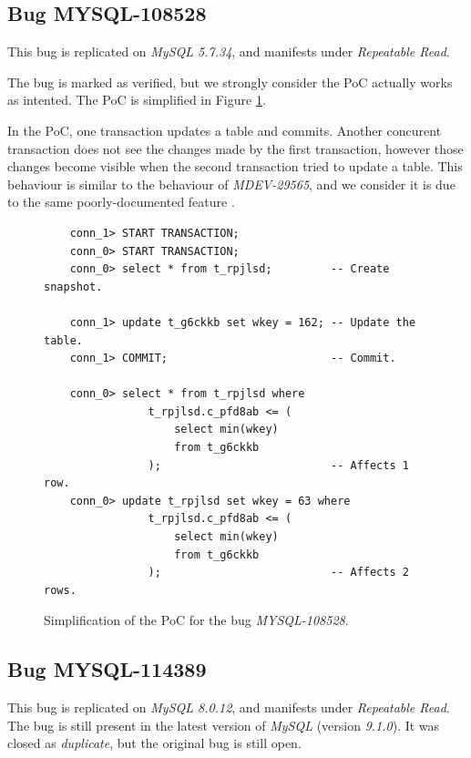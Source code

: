 \subsection*{Bug MYSQL-108528}

This bug is replicated on \textit{MySQL 5.7.34}, and manifests under \textit{Repeatable Read}.

The bug is marked as verified, but we strongly consider the PoC actually works as intented. The PoC is simplified in Figure \ref{fig:MYSQL-108528}.

In the PoC, one transaction updates a table and commits. Another concurent transaction does not see the changes made by the first transaction, however those changes become visible when the second transaction tried to update a table. This behaviour is similar to the behaviour of \textit{MDEV-29565}, and we consider it is due to the same poorly-documented feature \cite{mysqlconsistentread}.


\begin{figure}[H]
\begin{verbatim}
    conn_1> START TRANSACTION;
    conn_0> START TRANSACTION;
    conn_0> select * from t_rpjlsd;         -- Create snapshot.

    conn_1> update t_g6ckkb set wkey = 162; -- Update the table.
    conn_1> COMMIT;                         -- Commit.

    conn_0> select * from t_rpjlsd where
                t_rpjlsd.c_pfd8ab <= (
                    select min(wkey)
                    from t_g6ckkb
                );                          -- Affects 1 row.
    conn_0> update t_rpjlsd set wkey = 63 where
                t_rpjlsd.c_pfd8ab <= (
                    select min(wkey)
                    from t_g6ckkb
                );                          -- Affects 2 rows.
\end{verbatim}
\caption{Simplification of the PoC for the bug \textit{MYSQL-108528}.} \label{fig:MYSQL-108528}
\end{figure}



\subsection*{Bug MYSQL-114389}

This bug is replicated on \textit{MySQL 8.0.12}, and manifests under \textit{Repeatable Read}. The bug is still present in the latest version of \textit{MySQL} (version \textit{9.1.0}). It was closed as \textit{duplicate}, but the original bug is still open.

